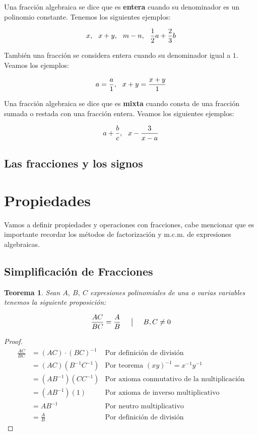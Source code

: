\documentclass[A4paper, 10pt, oneside]{book}
\newtheorem{theorem}{Teorema}[chapter]
\begin{document}
	Una fracción algebraica se dice que es \textbf{entera} cuando su denominador es un polinomio constante. Tenemos los siguientes ejemplos: 
	
	$$x, \hspace{2.5mm} x+y, \hspace{2.5mm} m-n, \hspace{2.5mm} \frac{1}{2}a+\frac{2}{3}b$$
	
	También una fracción se considera entera cuando su denominador igual a $1$. Veamos los ejemplos: 
	
	$$a=\frac{a}{1}, \hspace{2.5mm} x+y=\frac{x+y}{1}$$
	
	Una fracción algebraica se dice que es \textbf{mixta} cuando consta de una fracción sumada o restada con una fracción entera. Veamos los siguientes ejemplos:
	
	$$a+\frac{b}{c}, \hspace{2.5mm} x-\frac{3}{x-a}$$
	
	\subsection{Las fracciones y los signos}
	
	\section{Propiedades}
	Vamos a definir propiedades y operaciones con fracciones, cabe mencionar que es importante recordar los métodos de factorización y m.c.m. de expresiones algebraicas. 
	
	\subsection{Simplificación de Fracciones}
	
	\begin{theorem}
		\label{TeoSimpF}
		Sean $A, \ B, \ C$ expresiones polinomiales de una o varias variables tenemos la siguiente proposición: 
		
		$$\frac{AC}{BC} = \frac{A}{B} \hspace{5mm} \big| \hspace{5mm} B, C \neq 0$$
		
	\end{theorem}

	\begin{proof}
		\begin{align*}
			\frac{AC}{BC} &= (AC)\cdot(BC)^{-1} & \text{Por definición de división}\\
						  &=(AC)(B^{-1}C^{-1}) & \text{Por teorema $(xy)^{-1} = x^{-1}y^{-1}$}\\
						  &=(AB^{-1})(CC^{-1}) & \text{Por axioma conmutativo de la multiplicación}\\
						  &=(AB^{-1})(1) & \text{Por axioma de inverso multiplicativo}\\
						  &=AB^{-1} & \text{Por neutro multiplicativo}\\
						  &=\frac{A}{B} & \text{Por definición de división}
		\end{align*}
	\end{proof}
	
\end{document}
